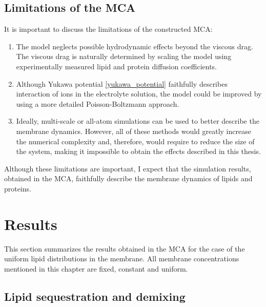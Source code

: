 \subsection{Limitations of the MCA}

It is important to discuss the limitations of the constructed MCA:

\begin{enumerate}
 \item The model neglects possible hydrodynamic effects beyond the viscous drag. The viscous drag is naturally determined by scaling the model using experimentally measured lipid and protein diffusion coefficients.
 \item Although Yukawa potential \eqref{yukawa_potential} faithfully describes interaction of ions in the electrolyte solution, the model could be improved by using a more detailed Poisson-Boltzmann approach.
 \item Ideally, multi-scale or all-atom simulations can be used to better describe the membrane dynamics. However, all of these methods would greatly increase the numerical complexity and, therefore, would require to reduce the size of the system, making it impossible to obtain the effects described in this thesis.
\end{enumerate}

Although these limitations are important, I expect that the simulation results, obtained in the MCA, faithfully describe the membrane dynamics of lipids and proteins.


\section{Results}

This section summarizes the results obtained in the MCA for the case of the uniform lipid distributions in the membrane. All membrane concentrations mentioned in this chapter are fixed, constant and uniform.

\subsection{Lipid sequestration and demixing}

\label{lipid_demixing}

